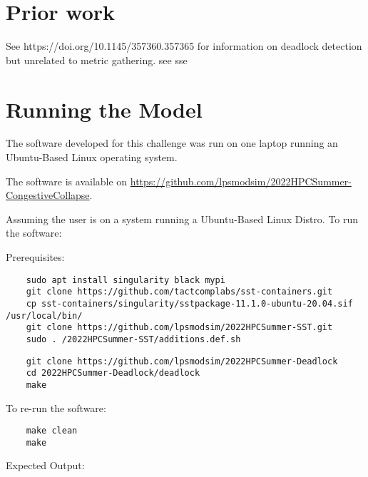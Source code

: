 \documentclass{article}
\begin{document}
\section{Prior work} %

See https://doi.org/10.1145/357360.357365 for information on deadlock detection but unrelated to metric gathering.
see %
sse %

\section{Running the Model}

The software developed for this challenge was run on one laptop running an Ubuntu-Based Linux operating system.

\noindent The software is available on \href{https://github.com/lpsmodsim/2022HPCSummer-CongestiveCollapse}{https://github.com/lpsmodsim/2022HPCSummer-CongestiveCollapse}.\newline

\noindent Assuming the user is on a system running a Ubuntu-Based Linux Distro. To run the software:\newline

\noindent Prerequisites: 

\begin{verbatim}
	sudo apt install singularity black mypi
	git clone https://github.com/tactcomplabs/sst-containers.git
	cp sst-containers/singularity/sstpackage-11.1.0-ubuntu-20.04.sif /usr/local/bin/
	git clone https://github.com/lpsmodsim/2022HPCSummer-SST.git
	sudo . /2022HPCSummer-SST/additions.def.sh
\end{verbatim}

\begin{verbatim}
	git clone https://github.com/lpsmodsim/2022HPCSummer-Deadlock
	cd 2022HPCSummer-Deadlock/deadlock
	make
\end{verbatim}

\noindent To re-run the software:

\begin{verbatim}
	make clean
	make
\end{verbatim}

\noindent Expected Output:
\end{document}
